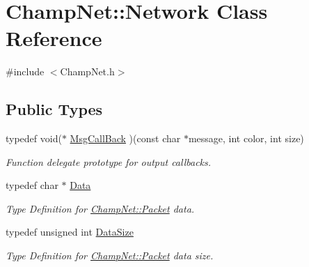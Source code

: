 \hypertarget{class_champ_net_1_1_network}{\section{Champ\-Net\-:\-:Network Class Reference}
\label{class_champ_net_1_1_network}
}


{\ttfamily \#include $<$Champ\-Net.\-h$>$}

\subsection*{Public Types}
\begin{DoxyCompactItemize}
\item 
\hypertarget{class_champ_net_1_1_network_a3f98f6ee0fd5617faa5679162195b39a}{typedef void($\ast$ \hyperlink{class_champ_net_1_1_network_a3f98f6ee0fd5617faa5679162195b39a}{Msg\-Call\-Back} )(const char $\ast$message, int color, int size)}\label{class_champ_net_1_1_network_a3f98f6ee0fd5617faa5679162195b39a}

\begin{DoxyCompactList}\small\item\em Function delegate prototype for output callbacks. \end{DoxyCompactList}\item 
\hypertarget{class_champ_net_1_1_network_af03ef34820a69b9ef3f2dc3065a29c3f}{typedef char $\ast$ \hyperlink{class_champ_net_1_1_network_af03ef34820a69b9ef3f2dc3065a29c3f}{Data}}\label{class_champ_net_1_1_network_af03ef34820a69b9ef3f2dc3065a29c3f}

\begin{DoxyCompactList}\small\item\em Type Definition for \hyperlink{class_champ_net_1_1_packet}{Champ\-Net\-::\-Packet} data. \end{DoxyCompactList}\item 
\hypertarget{class_champ_net_1_1_network_a5f153a3f9a1687d10922c946e2f0662e}{typedef unsigned int \hyperlink{class_champ_net_1_1_network_a5f153a3f9a1687d10922c946e2f0662e}{Data\-Size}}\label{class_champ_net_1_1_network_a5f153a3f9a1687d10922c946e2f0662e}

\begin{DoxyCompactList}\small\item\em Type Definition for \hyperlink{class_champ_net_1_1_packet}{Champ\-Net\-::\-Packet} data size. \end{DoxyCompactList}\end{DoxyCompactItemize}

